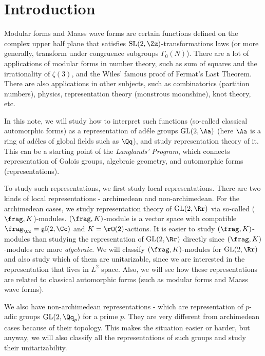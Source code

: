 \newpage
\section{Introduction}

Modular forms and Maass wave forms are certain functions defined on the complex upper half plane that satisfies $\SL(2, \Zz)$-transformations laws (or more generally, transform under congruence subgroups $\Gamma_{0}(N)$). 
There are a lot of applications of modular forms in number theory, such as sum of squares and the irrationality of $\zeta(3)$, and the Wiles' famous proof of Fermat's Last Theorem. 
There are also applications in other subjects, such as combinatorics (partition numbers), physics, representation theory (monstrous moonshine), knot theory, etc. 
 
In this note, we will study how to interpret such functions (so-called classical automorphic forms) as a representation of ad\'ele groups $\GL(2, \Aa)$ (here $\Aa$ is a ring of ad\'eles of global fields such as $\Qq$), and study representation theory of it. 
This can be a starting point of the \emph{Langlands' Program}, which connects representation of Galois groups, algebraic geometry, and automorphic forms (representations). 

To study such representations, we first study local representations. 
There are two kinds of local representations - archimedean and non-archimedean. 
For the archimedean cases, we study representation theory of $\GL(2, \Rr)$  via so-called ($\frag, K$)-modules. $(\frag, K)$-module is a vector space with compatible $\frag_{\Cc} = \mathfrak{gl}(2, \Cc)$ and $K = \rO(2)$-actions. It is easier to study $(\frag, K)$-modules than studying the representation of $\GL(2, \Rr)$ directly since $(\frag, K)$-modules are more \emph{algebraic}. We will classify $(\frag, K)$-modules for $\GL(2, \Rr)$ and also study which of them are unitarizable, since we are interested in the representation that lives in $L^{2}$ space. Also, we will see how these representations are related to classical automorphic forms (such as modular forms and Maass wave forms). 

We also have non-archimedean representations - which are representation of $p$-adic groups $\GL(2, \Qq_{p})$ for a prime $p$. They are very different from archimedean cases because of their topology. This makes the situation easier or harder, but anyway, we will also classify all the representations of such groups and study their unitarizability. 

